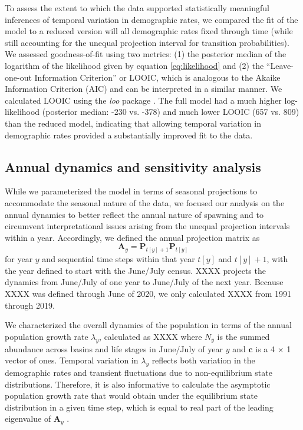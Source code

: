To assess the extent to which the data supported statistically meaningful inferences
of temporal variation in demographic rates,
we compared the fit of the model to a reduced version will all demographic rates
fixed through time
(while still accounting for the unequal projection interval for transition probabilities).
We assessed goodness-of-fit using two metrics:
(1) the posterior median of the logarithm
of the likelihood given by equation \ref{eq:likelihood}
and (2) the ``Leave-one-out Information Criterion'' or LOOIC,
which is analogous to the Akaike Information Criterion (AIC)
and can be interpreted in a similar manner.
We calculated LOOIC using the \emph{loo} package \citep{loo}.
The full model had a much higher log-likelihood (posterior median: -230 vs. -378)
and much lower LOOIC (657 vs. 809) than the reduced model,
indicating that allowing temporal variation in demographic rates provided a
substantially improved fit to the data.




\subsection*{Annual dynamics and sensitivity analysis}


While we parameterized the model in terms of seasonal projections
to accommodate the seasonal nature of the data,
we focused our analysis on the annual dynamics to better reflect
the annual nature of spawning and to circumvent interpretational
issues arising from the unequal projection intervals within a year.
Accordingly, we defined the annual projection matrix as
%
\begin{equation} \label{eq:A}
\mathbf{A}_y = \mathbf{P}_{t[y]+1} \mathbf{P}_{t[y]}
\end{equation}
%
for year $y$ and sequential time steps within that year $t[y]$ and $t[y]+1$,
with the year defined to start with the June/July census.
XXXX projects the dynamics from
June/July of one year to June/July of the next year.
Because XXXX was defined through June of 2020,
we only calculated XXXX from 1991 through 2019.

We characterized the overall dynamics of the population in terms of the annual
population growth rate $\lambda_y$, calculated as
%
XXXX
%
where $N_y$ is the summed abundance across basins and life stages in June/July of year $y$
and $\mathbf{c}$ is a 4 $\times$ 1 vector of ones.
Temporal variation in $\lambda_y$ reflects both variation in the demographic rates
and transient fluctuations due to non-equilibrium state distributions.
Therefore, it is also informative to calculate
the asymptotic population growth rate that
would obtain under the equilibrium state distribution in a given time step,
which is equal to real part of the leading eigenvalue of $\mathbf{A}_y$
\citep{caswell2001matrix}.

